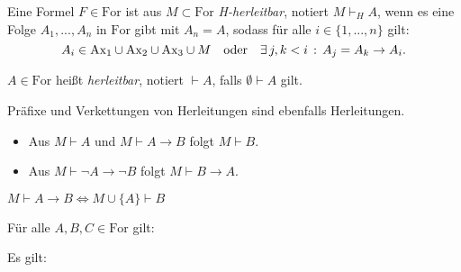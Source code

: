 \documentclass{cheat-sheet}
\newcommand{\For}{\mathrm{For}}
\newcommand{\Ax}{\mathrm{Ax}}
\begin{document}
\begin{defn}
  Eine Formel $F \in \For$ ist aus $M \subset \For$ \emph{H-herleitbar}, notiert $M \vdash_H A$, wenn es eine Folge $A_1, ..., A_n$ in $\For$ gibt mit $A_n = A$, sodass für alle $i \in \{ 1, ..., n \}$ gilt:
  \[
    A_i \in \Ax_1 \cup \Ax_2 \cup \Ax_3 \cup M
    \quad \text{oder} \quad
    \ex{j, k < i} A_j = A_k \to A_i.
  \]
\end{defn}

\begin{defn}
  $A \in \For$ heißt \emph{herleitbar}, notiert $\vdash A$, falls $\emptyset \vdash A$ gilt.
\end{defn}

\begin{beob}
  Präfixe und Verkettungen von Herleitungen sind ebenfalls Herleitungen.
\end{beob}

\begin{prop}
  \begin{itemize}
    \item Aus $M \vdash A$ und $M \vdash A \to B$ folgt $M \vdash B$.
    \item Aus $M \vdash \neg A \to \neg B$ folgt $M \vdash B \to A$.
  \end{itemize}
\end{prop}

\begin{satz}[Deduktionstheorem]
  $M \vdash A \to B \iff M \cup \{ A \} \vdash B$
\end{satz}

\begin{satz}
  Für alle $A, B, C \in \For$ gilt:
  \begin{itemize}
  \end{itemize}
\end{satz}

\begin{prop}
  Es gilt:
  
  \begin{center}
    \begin{minipage}{0.4\linewidth}
      \begin{prooftree}
      \end{prooftree}
    \end{minipage}
    \begin{minipage}{0.15\linewidth}
      \begin{prooftree}
      \end{prooftree}
    \end{minipage}
  \end{center}
\end{prop}
\end{document}
